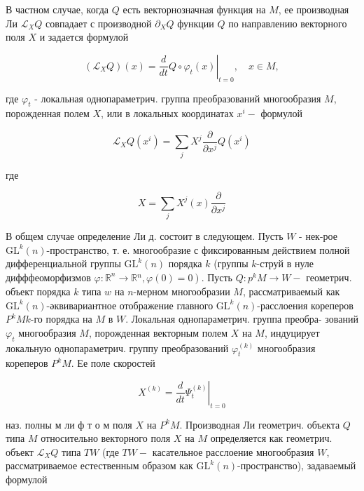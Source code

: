 \documentclass[10pt]{article}
\begin{document}
В частном случае, когда $Q$ есть векторнозначная функция на $M$, ее производная Ли $\mathscr{L}_{X} Q$ совпадает с производной $\partial_{X} Q$ функции $Q$ по направлению векторного поля $X$ и задается формулой



\[

\left(\mathscr{L}_{X} Q\right)(x)=\left.\frac{d}{d t} Q \circ \varphi_{t}(x)\right|_{t=0}, \quad x \in M,

\]



где $\varphi_{t}$ - локальная однопараметрич. группа преобразований многообразия $M$, порожденная полем $X$, или в локальных координатах $x^{i}-$ формулой



\[

\mathscr{L}_{X} Q\left(x^{i}\right)=\sum_{j} X^{j} \frac{\partial}{\partial x^{j}} Q\left(x^{i}\right)

\]



где



\[

X=\sum_{j} X^{j}(x) \frac{\partial}{\partial x^{j}}

\]



В общем случае определение Ли д. состоит в следующем. Пусть $W$ - нек-рое $\mathrm{GL}^{k}(n)$-пространство, т. е. многообразие с фиксированным действием полной дифференциальной группы $\mathrm{GL}^{k}(n)$ порядка $k$ (группы $k$-струй в нуле дифффеоморфизмов $\left.\varphi: \mathbb{R}^{n} \rightarrow \mathbb{R}{ }^{n}, \varphi(0)=0\right)$. Пусть $Q: p^{k} M \rightarrow W-$ геометрич. объект порядка $k$ типа $w$ на $n$-мерном многообразии $M$, рассматриваемый как $\mathrm{GL}^{k}(n)$-әквивариантное отображение главного $\mathrm{GL}^{k}(n)$-расслоения кореперов $P^{k} M k$-го порядка на $M$ в $W$. Локальная однопараметрич. группа преобра- зований $\varphi_{t}$ многообразия $M$, порожденная векторным полем $X$ на $M$, индуцирует локальную однопараметрич. группу преобразований $\varphi_{t}^{(k)}$ многообразия кореперов $P^{k} M$. Ее поле скоростей



\[

X^{(k)}=\left.\frac{d}{d t} \Psi_{t}^{(k)}\right|_{t=0}

\]



наз. полны м ли ф т о м поля $X$ на $P^{k} M$. Производная Ли геометрич. объекта $Q$ типа $M$ относительно векторного поля $X$ на $M$ определяется как геометрич. объект $\mathscr{L}_{X} Q$ типа $T W$ (где $T W-$ касательное расслоение многообразия $W$, рассматриваемое естественным образом как $\mathrm{GL}^{k}(n)$-пространство), задаваемый формулой
\end{document}
